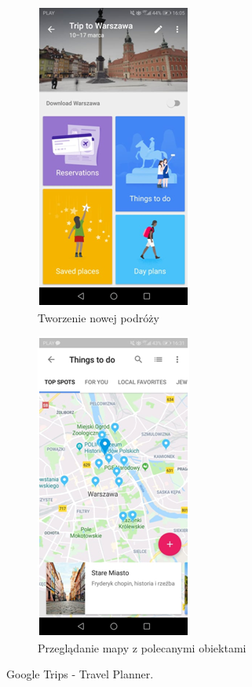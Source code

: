 \documentclass[10pt,twoside,a4paper]{report}
\begin{document}
\begin{figure}[h]
\begin{subfigure}{0.5\textwidth}
\centering
\includegraphics[width=0.9\linewidth, width=5cm]{googletrips1}
\caption{Tworzenie nowej podróży}
\label{fig:GTsubim1}
\end{subfigure}
\begin{subfigure}{0.5\textwidth}
\centering
\includegraphics[width=0.9\linewidth, width=5cm]{googletrips2}
\caption{Przeglądanie mapy z polecanymi obiektami}
\label{fig:GTsubim2}
\end{subfigure}
\caption{Google Trips - Travel Planner.}
\label{fig:GTimage1}
\end{figure}
\end{document}
